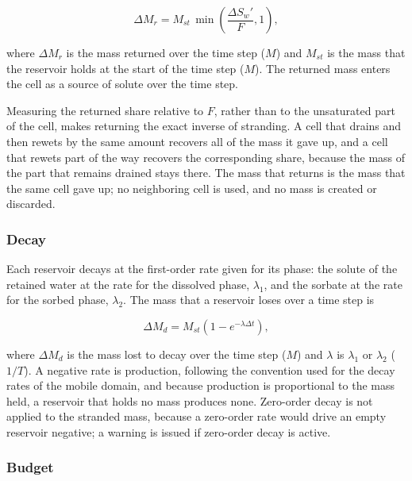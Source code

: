 \begin{equation}
\label{eqn:strandreturn}
\Delta M_r = M_{st} \, \min \left ( \frac{\Delta S_w'}{F}, 1 \right ) ,
\end{equation}

\noindent where $\Delta M_r$ is the mass returned over the time step ($M$) and $M_{st}$ is the mass that the reservoir holds at the start of the time step ($M$). The returned mass enters the cell as a source of solute over the time step.

Measuring the returned share relative to $F$, rather than to the unsaturated part of the cell, makes returning the exact inverse of stranding. A cell that drains and then rewets by the same amount recovers all of the mass it gave up, and a cell that rewets part of the way recovers the corresponding share, because the mass of the part that remains drained stays there. The mass that returns is the mass that the same cell gave up; no neighboring cell is used, and no mass is created or discarded.

\subsubsection{Decay}

Each reservoir decays at the first-order rate given for its phase: the solute of the retained water at the rate for the dissolved phase, $\lambda_1$, and the sorbate at the rate for the sorbed phase, $\lambda_2$. The mass that a reservoir loses over a time step is

\begin{equation}
\label{eqn:stranddecay}
\Delta M_d = M_{st} \left ( 1 - e^{-\lambda \Delta t} \right ) ,
\end{equation}

\noindent where $\Delta M_d$ is the mass lost to decay over the time step ($M$) and $\lambda$ is $\lambda_1$ or $\lambda_2$ ($1/T$). A negative rate is production, following the convention used for the decay rates of the mobile domain, and because production is proportional to the mass held, a reservoir that holds no mass produces none. Zero-order decay is not applied to the stranded mass, because a zero-order rate would drive an empty reservoir negative; a warning is issued if zero-order decay is active.

\subsubsection{Budget}

